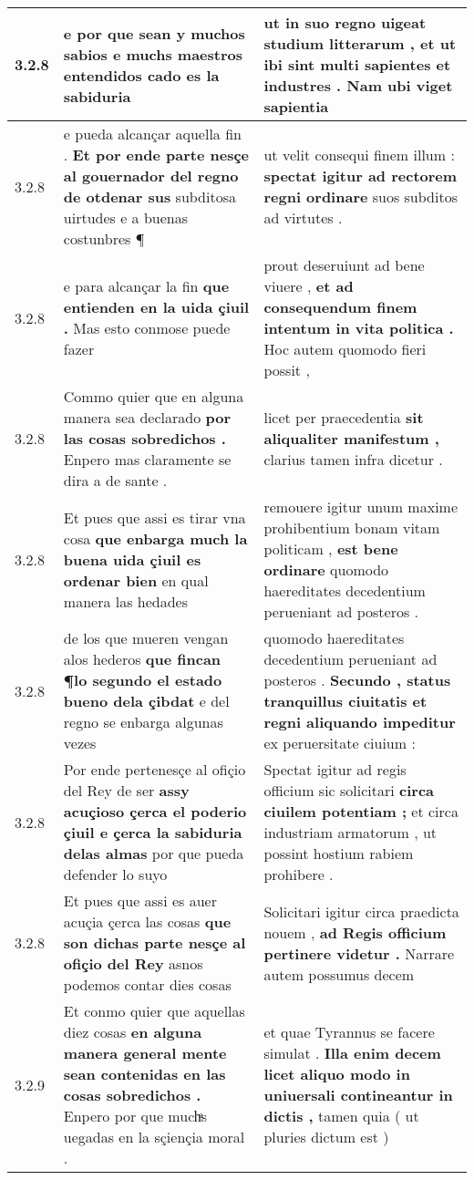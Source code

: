 \begin{tabular}{|p{1cm}|p{6.5cm}|p{6.5cm}|}
3.2.8 & e por que sean y muchos sabios \textbf{ e muchs maestros entendidos } cado es la sabiduria & ut in suo regno uigeat studium litterarum , \textbf{ et ut ibi sint multi sapientes et industres . } Nam ubi viget sapientia \\\hline
3.2.8 & e pueda alcançar aquella fin . \textbf{ Et por ende parte nesçe al gouernador del regno de otdenar sus } subditosa uirtudes e a buenas costunbres ¶ & ut velit consequi finem illum : \textbf{ spectat igitur ad rectorem regni ordinare } suos subditos ad virtutes . \\\hline
3.2.8 & e para alcançar la fin \textbf{ que entienden en la uida çiuil . } Mas esto conmose puede fazer & prout deseruiunt ad bene viuere , \textbf{ et ad consequendum finem intentum in vita politica . } Hoc autem quomodo fieri possit , \\\hline
3.2.8 & Commo quier que en alguna manera sea declarado \textbf{ por las cosas sobredichos . } Enpero mas claramente se dira a de sante . & licet per praecedentia \textbf{ sit aliqualiter manifestum , } clarius tamen infra dicetur . \\\hline
3.2.8 & Et pues que assi es tirar vna cosa \textbf{ que enbarga much la buena uida çiuil es ordenar bien } en qual manera las hedades & remouere igitur unum maxime prohibentium bonam vitam politicam , \textbf{ est bene ordinare } quomodo haereditates decedentium perueniant ad posteros . \\\hline
3.2.8 & de los que mueren vengan alos hederos \textbf{ que fincan ¶lo segundo el estado bueno dela çibdat } e del regno se enbarga algunas vezes & quomodo haereditates decedentium perueniant ad posteros . \textbf{ Secundo , status tranquillus ciuitatis et regni aliquando impeditur } ex peruersitate ciuium : \\\hline
3.2.8 & Por ende pertenesçe al ofiçio del Rey de ser \textbf{ assy acuçioso çerca el poderio çiuil e çerca la sabiduria delas almas } por que pueda defender lo suyo & Spectat igitur ad regis officium sic solicitari \textbf{ circa ciuilem potentiam ; } et circa industriam armatorum , ut possint hostium rabiem prohibere . \\\hline
3.2.8 & Et pues que assi es auer acuçia çerca las cosas \textbf{ que son dichas parte nesçe al ofiçio del Rey } asnos podemos contar dies cosas & Solicitari igitur circa praedicta nouem , \textbf{ ad Regis officium pertinere videtur . } Narrare autem possumus decem \\\hline
3.2.9 & Et conmo quier que aquellas diez cosas \textbf{ en alguna manera general mente sean contenidas en las cosas sobredichos . } Enpero por que muchͣs uegadas en la sçiençia moral . & et quae Tyrannus se facere simulat . \textbf{ Illa enim decem licet aliquo modo in uniuersali contineantur in dictis , } tamen quia ( ut pluries dictum est ) \\\hline

\end{tabular}
